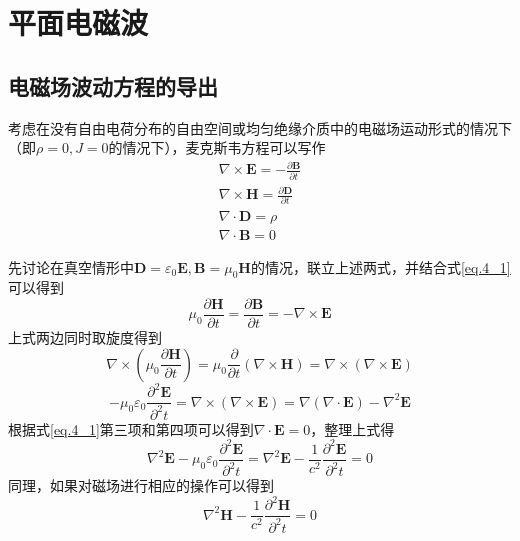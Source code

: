 \section{平面电磁波}
    \subsection{电磁场波动方程的导出}
        考虑在没有自由电荷分布的自由空间或均匀绝缘介质中的电磁场运动形式的情况下（即$\rho=0,J=0$的情况下），麦克斯韦方程可以写作
        \begin{equation}
            \label{eq.4_1}
            \begin{gathered}
            \nabla \times \boldsymbol{E}=-\frac{\partial \mathbf{B}}{\partial t} \\
            \nabla \times \mathbf{H}=\frac{\partial \mathbf{D}}{\partial t} \\
            \nabla \cdot \boldsymbol{D}=\rho \\
            \nabla \cdot \mathbf{B}=0
            \end{gathered}
        \end{equation}

        先讨论在真空情形中$\boldsymbol{D}=\varepsilon_{0} \boldsymbol{E}, \boldsymbol{B}=\mu_{0} \mathbf{H}$的情况，联立上述两式，并结合式\ref{eq.4_1}可以得到
            \begin{equation}
                \label{eq.4_2}
                \mu_0 \frac{\partial \boldsymbol{H}}{\partial t} = \frac{\partial \boldsymbol{B}}{\partial t} = - \nabla \times \boldsymbol{E}
            \end{equation}
        上式两边同时取旋度得到
            \begin{equation}
                \nabla \times (\mu_0 \frac{\partial \boldsymbol{H}}{\partial t}) = \mu_0 \frac{ \partial }{\partial t}(\nabla \times \boldsymbol{H}) = \nabla \times (\nabla \times \boldsymbol{E})
            \end{equation}
            \begin{equation}
                -\mu_0 \varepsilon_0 \frac{\partial^2 \boldsymbol{E}}{\partial^2 t} = \nabla \times (\nabla \times \boldsymbol{E}) = \nabla(\nabla \cdot \boldsymbol{E})-\nabla^2 \boldsymbol{E}
            \end{equation}
        根据式\ref{eq.4_1}第三项和第四项可以得到$\nabla \cdot \boldsymbol{E}=0$，整理上式得
            \begin{equation}
                \label{eq.4_5}
                \nabla^2 \boldsymbol{E} - \mu_0 \varepsilon_0 \frac{\partial^2 \boldsymbol{E}}{\partial^2 t} = \nabla^2 \boldsymbol{E} - \frac{1}{c^2} \frac{\partial^2 \boldsymbol{E}}{\partial^2 t}= 0
            \end{equation}
        同理，如果对磁场进行相应的操作可以得到
        \begin{equation}
            \label{eq.4_6}
            \nabla^2 \boldsymbol{H} - \frac{1}{c^2} \frac{\partial^2 \boldsymbol{H}}{\partial^2 t}= 0
        \end{equation}

